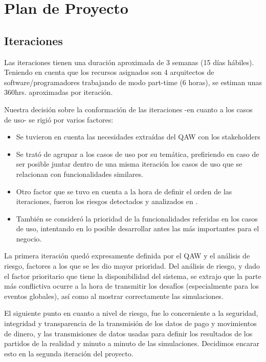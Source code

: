 \section{Plan de Proyecto}
\label{sec:planificacion}
\subsection{Iteraciones}
Las iteraciones tienen una duración aproximada de 3 semanas (15 días hábiles). Teniendo en cuenta que los recursos asignados son 4 arquitectos de software/programadores trabajando de modo part-time (6 horas), se estiman unas 360hrs. aproximadas por iteración.

Nuestra decisión sobre la conformación de las iteraciones -en cuanto a los casos de uso- se rigió por varios factores: 
\begin{itemize}
\item Se tuvieron en cuenta las necesidades extraídas del QAW con los stakeholders
\item Se trató de agrupar a los casos de uso por su temática, prefiriendo en caso de ser posible juntar dentro de una misma iteración los casos de uso que se relacionan con funcionalidades similares.
\item Otro factor que se tuvo en cuenta a la hora de definir el orden de las iteraciones, fueron los riesgos detectados y analizados en .
\item También se consideró la prioridad de la funcionalidades referidas en los casos de uso, intentando en lo posible desarrollar antes las más importantes para el negocio.
\end{itemize}

La primera iteración quedó expresamente definida por el QAW y el análisis de riesgo, factores a los que se les dio mayor prioridad. 
Del análisis de riesgo, y dado el factor prioritario que tiene la disponibilidad del sistema, se extrajo que la parte más conflictiva ocurre a la hora de transmitir los desafíos (especialmente para los eventos globales), así como al mostrar correctamente las simulaciones.

El siguiente punto en cuanto a nivel de riesgo, fue lo concerniente a la seguridad, integridad y transparencia de la transmisión de los datos de pago y movimientos de dinero, y las transmisiones de datos usadas para definir los resultados de los partidos de la realidad y minuto a minuto de las simulaciones. Decidimos encarar esto en la segunda iteración del proyecto.

